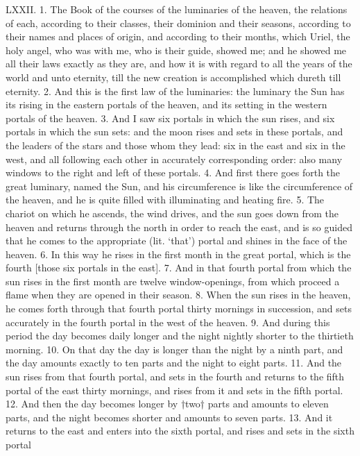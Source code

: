 LXXII. 1. The Book of the courses of the luminaries
of the heaven, the relations of each, according
to their classes, their dominion and their seasons,
according to their names and places of origin, and
according to their months, which Uriel, the holy
angel, who was with me, who is their guide, showed
me; and he showed me all their laws exactly as they
are, and how it is with regard to all the years of the
world and unto eternity, till the new creation is
accomplished which dureth till eternity. 2. And this
is the first law of the luminaries: the luminary the
Sun has its rising in the eastern portals of the heaven,
and its setting in the western portals of the heaven.
3. And I saw six portals in which the sun rises, and
six portals in which the sun sets: and the moon rises
and sets in these portals, and the leaders of the stars
and those whom they lead: six in the east and six
in the west, and all following each other in accurately
corresponding order: also many windows to the right
and left of these portals. 4. And first there goes
forth the great luminary, named the Sun, and his
circumference is like the circumference of the heaven,
and he is quite filled with illuminating and heating
fire. 5. The chariot on which he ascends, the wind
drives, and the sun goes down from the heaven and
returns through the north in order to reach the east,
and is so guided that he comes to the appropriate
(lit. ‘that’) portal and shines in the face of the
heaven. 6. In this way he rises in the first month in
the great portal, which is the fourth [those six portals
in the east]. 7. And in that fourth portal from
which the sun rises in the first month are twelve
window-openings, from which proceed a flame when
they are opened in their season. 8. When the sun
rises in the heaven, he comes forth through that
fourth portal thirty mornings in succession, and sets
accurately in the fourth portal in the west of the
heaven. 9. And during this period the day becomes
daily longer and the night nightly shorter to the
thirtieth morning. 10. On that day the day is
longer than the night by a ninth part, and the day
amounts exactly to ten parts and the night to eight
parts. 11. And the sun rises from that fourth portal,
and sets in the fourth and returns to the fifth portal
of the east thirty mornings, and rises from it and sets
in the fifth portal. 12. And then the day becomes
longer by †two† parts and amounts to eleven parts,
and the night becomes shorter and amounts to seven
parts. 13. And it returns to the east and enters into
the sixth portal, and rises and sets in the sixth portal
